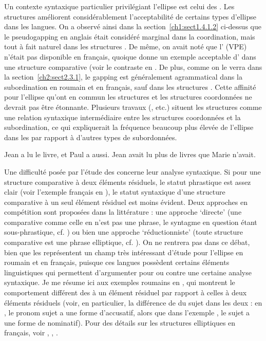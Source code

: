 Un contexte syntaxique particulier privilégiant l’ellipse est celui des  \citep{Lechner2004}. Les structures  améliorent considérablement l’acceptabilité de certains types d’ellipse dans les langues. On a observé ainsi dans la section~\ref{ch1:sect1.4.1.2} ci-dessus que le pseudogapping en anglais était considéré marginal dans la coordination, mais tout à fait naturel dans les structures . De même, on avait noté que l’ (VPE) n’était pas disponible en français, quoique \citet{Boeckx2000} donne un exemple acceptable d’ dans une structure comparative (voir le contraste en . De plus, comme on le verra dans la section~\ref{ch2:sect2.3.1}, le gapping est généralement agrammatical dans la subordination en roumain et en français, sauf dans les structures . Cette affinité pour l’ellipse qu’ont en commun les structures  et les structures coordonnées ne devrait pas être étonnante. Plusieurs travaux (\citealt{Moltmann1992,Osborne2009}, etc.) situent les structures  comme une relation syntaxique intermédiaire entre les structures coordonnées et la subordination, ce qui expliquerait la fréquence beaucoup plus élevée de l’ellipse dans les  par rapport à d’autres types de subordonnées.

\ea \label{ch1:ex85}
\ea  *Jean a lu le livre, et Paul a aussi. 
\ex  Jean avait lu plus de livres que Marie n’avait. \citep[119]{Boeckx2000}
\z
\z

Une difficulté posée par l’étude des  concerne leur analyse syntaxique. Si pour une structure comparative à deux éléments résiduels, le statut phrastique est assez clair (voir l’exemple français en ), le statut syntaxique d’une structure comparative à un seul élément résiduel  est moins évident. Deux approches en compétition sont proposées dans la littérature : une approche ‘directe’ (une comparative comme celle en  n’est pas une phrase, le syntagme en question étant sous-phrastique, cf. \citealt{Huddleston1967,Hankamer1973,Hoeksema1983}) ou bien une approche ‘réductionniste’ (toute structure comparative est une phrase elliptique, cf. \citealt{Bresnan1973,Lechner2001,Lechner2004}). On ne rentrera pas dans ce débat, bien que les  représentent un champ très intéressant d’étude pour l’ellipse en roumain et en français, puisque ces langues possèdent certains éléments linguistiques qui permettent d’argumenter pour ou contre une certaine analyse syntaxique. Je me résume ici aux exemples roumains en , qui montrent le comportement différent des  à un élément résiduel par rapport à celles à deux éléments résiduels (voir, en particulier, la différence de  du sujet dans les deux  : en , le pronom sujet a une forme d’accusatif, alors que dans l’exemple , le sujet a une forme de nominatif). Pour des détails sur les structures  elliptiques en français, voir \citet{AmsiliEtAl2008}, \citet{Desmets2008}, \citet{MouretEtAl2008}.  

